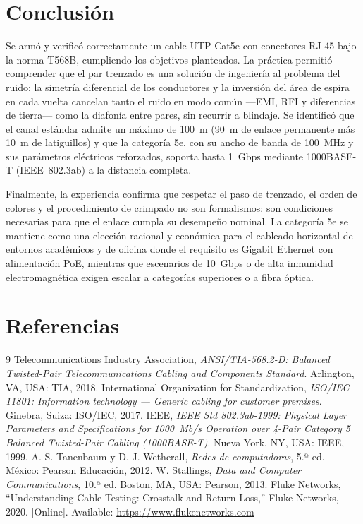 \documentclass[11pt,a4paper]{article}
\begin{document}
\section{Conclusión}

Se armó y verificó correctamente un cable UTP Cat5e con conectores RJ-45 bajo
la norma T568B, cumpliendo los objetivos planteados. La práctica permitió
comprender que el par trenzado es una solución de ingeniería al problema del
ruido: la simetría diferencial de los conductores y la inversión del área de
espira en cada vuelta cancelan tanto el ruido en modo común —EMI, RFI y
diferencias de tierra— como la diafonía entre pares, sin recurrir a blindaje.
Se identificó que el canal estándar admite un máximo de 100~m (90~m de enlace
permanente más 10~m de latiguillos) y que la categoría 5e, con su ancho de
banda de 100~MHz y sus parámetros eléctricos reforzados, soporta hasta
1~Gbps mediante 1000BASE-T (IEEE~802.3ab) a la distancia completa.

Finalmente, la experiencia confirma que respetar el paso de trenzado, el
orden de colores y el procedimiento de crimpado no son formalismos: son
condiciones necesarias para que el enlace cumpla su desempeño nominal. La
categoría 5e se mantiene como una elección racional y económica para el
cableado horizontal de entornos académicos y de oficina donde el requisito es
Gigabit Ethernet con alimentación PoE, mientras que escenarios de 10~Gbps o de
alta inmunidad electromagnética exigen escalar a categorías superiores o a
fibra óptica.

\section*{Referencias}

\begin{thebibliography}{9}
   Telecommunications Industry Association, \textit{ANSI/TIA-568.2-D: Balanced Twisted-Pair Telecommunications Cabling and Components Standard}. Arlington, VA, USA: TIA, 2018.
   International Organization for Standardization, \textit{ISO/IEC 11801: Information technology --- Generic cabling for customer premises}. Ginebra, Suiza: ISO/IEC, 2017.
   IEEE, \textit{IEEE Std 802.3ab-1999: Physical Layer Parameters and Specifications for 1000~Mb/s Operation over 4-Pair Category 5 Balanced Twisted-Pair Cabling (1000BASE-T)}. Nueva York, NY, USA: IEEE, 1999.
   A. S. Tanenbaum y D. J. Wetherall, \textit{Redes de computadoras}, 5.ª ed. México: Pearson Educación, 2012.
   W. Stallings, \textit{Data and Computer Communications}, 10.ª ed. Boston, MA, USA: Pearson, 2013.
   Fluke Networks, ``Understanding Cable Testing: Crosstalk and Return Loss,'' Fluke Networks, 2020. [Online]. Available: \url{https://www.flukenetworks.com}
\end{thebibliography}
\end{document}

